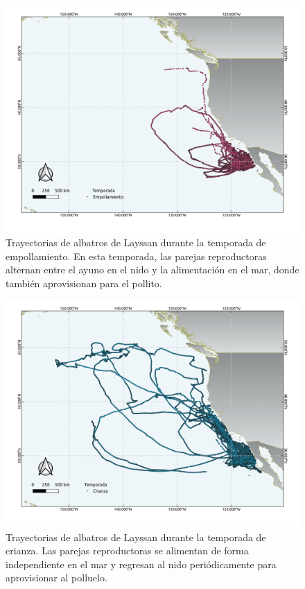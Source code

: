 \begin{figure}[h]
    \centering
    \includegraphics[scale=0.60]{figures/seasonsEmpollamiento.png}
    \caption{Trayectorias de albatros de Layssan durante la temporada de
    empollamiento. En esta temporada, las parejas reproductoras alternan entre
    el ayuno en el nido y la alimentación en el mar, donde también aprovisionan
    para el pollito.}
    \label{fig:empollamiento}
\end{figure}

\begin{figure}[h]
    \centering
    \includegraphics[scale=0.60]{figures/seasonsCrianza.png}
    \caption{Trayectorias de albatros de Layssan durante la temporada de
    crianza. Las parejas reproductoras se alimentan de forma independiente en el
    mar y regresan al nido periódicamente para aprovisionar al polluelo.}
    \label{fig:crianza}
\end{figure}


